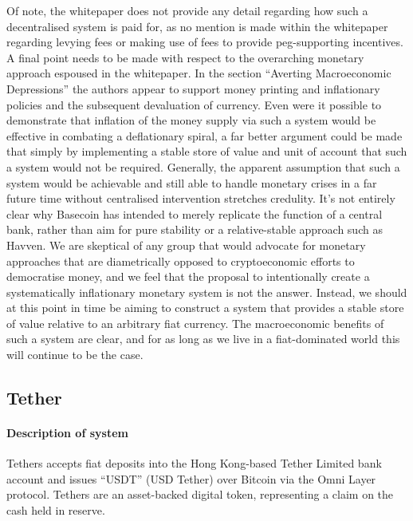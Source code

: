 \noindent Of note, the whitepaper does not provide any detail regarding how such a decentralised system is paid for, as no mention is made within the whitepaper regarding levying fees or making use of fees to provide peg-supporting incentives. \\

\noindent A final point needs to be made with respect to the overarching monetary approach espoused in the whitepaper. In the section ``Averting Macroeconomic Depressions'' the authors appear to support money printing and inflationary policies and the subsequent devaluation of currency. Even were it possible to demonstrate that inflation of the money supply via such a system would be effective in combating a deflationary spiral, a far better argument could be made that simply by implementing a stable store of value and unit of account that such a system would not be required. Generally, the apparent assumption that such a system would be achievable and still able to handle monetary crises in a far future time without centralised intervention stretches credulity. It's not entirely clear why Basecoin has intended to merely replicate the function of a central bank, rather than aim for pure stability or a relative-stable approach such as Havven. We are skeptical of any group that would advocate for monetary approaches that are diametrically opposed to cryptoeconomic efforts to democratise money, and we feel that the proposal to intentionally create a systematically inflationary monetary system is not the answer. Instead, we should at this point in time be aiming to construct a system that provides a stable store of value relative to an arbitrary fiat currency. The macroeconomic benefits of such a system are clear, and for as long as we live in a fiat-dominated world this will continue to be the case.

\subsection{Tether}

\paragraph{Description of system}

Tethers accepts fiat deposits into the Hong Kong-based Tether Limited bank account and issues ``USDT'' (USD Tether) over Bitcoin via the Omni Layer protocol. Tethers are an asset-backed digital token, representing a claim on the cash held in reserve. \\

